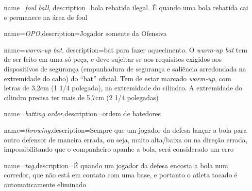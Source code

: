 {
	name=\textit{foul ball},
 description={bola rebatida ilegal. \'E quando uma bola rebatida cai e permanece na área de \gls{foul}}
}

{ name=\textit{OPO},description={Jogador somente da Ofensiva}}

{ name=\textit{warm-up bat},
	description={\gls{bat} para fazer aquecimento. O \textit{warm-up bat} tem de ser feito em uma só peça, e deve sujeitar-se aos requisitos exigidos aos dispositivos de segurança (empunhadura de segurança e saliência arredondada na extremidade do cabo) do “bat” oficial. Tem de estar marcado \textit{warm-up}, com letras de 3,2cm (1 1/4 polegada), na extremidade do cilindro. A extremidade do cilindro precisa ter mais de 5,7cm (2 1/4 polegadas)}}

{ name=\textit{batting order},description={ordem de batedores}}

{ name=\textit{throwing},description={Sempre que um jogador da defesa lançar a bola para outro defensor de maneira errada, ou seja, muito alta/baixa ou na direção errada, impossibilitando que o companheiro apanhe a bola, será considerado um erro}}

{ name=\textit{tag},description={\'E quando um jogador da defesa encosta a bola num corredor, que não est\'a em contato com uma base, e portanto o atleta tocado \'e automaticamente eliminado}}




